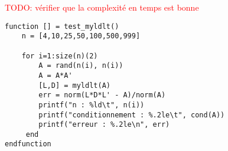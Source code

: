 \documentclass{article}
\begin{document}
\textcolor{red}{TODO: vérifier que la complexité en temps est bonne}



\begin{verbatim}
function [] = test_myldlt()
    n = [4,10,25,50,100,500,999]
    
    for i=1:size(n)(2)
        A = rand(n(i), n(i))
        A = A*A'
        [L,D] = myldlt(A)
        err = norm(L*D*L' - A)/norm(A)
        printf("n : %ld\t", n(i))
        printf("conditionnement : %.2le\t", cond(A))
        printf("erreur : %.2le\n", err)
     end
endfunction
\end{verbatim}
\end{document}
